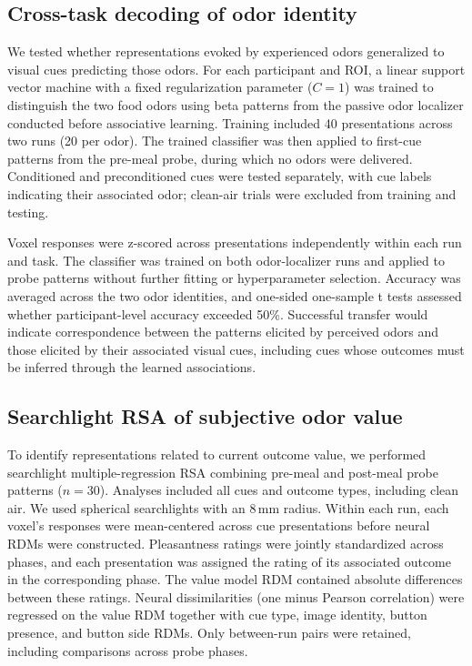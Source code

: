 \documentclass[9pt,twocolumn,twoside]{pnas-new}
\begin{document}
{\subsection*{Cross-task decoding of odor identity}

We tested whether representations evoked by experienced odors generalized to visual cues predicting those odors. For each participant and ROI, a linear support vector machine with a fixed regularization parameter ($C = 1$) was trained to distinguish the two food odors using beta patterns from the passive odor localizer conducted before associative learning. Training included 40 presentations across two runs (20 per odor). The trained classifier was then applied to first-cue patterns from the pre-meal probe, during which no odors were delivered. Conditioned and preconditioned cues were tested separately, with cue labels indicating their associated odor; clean-air trials were excluded from training and testing.

Voxel responses were z-scored across presentations independently within each run and task. The classifier was trained on both odor-localizer runs and applied to probe patterns without further fitting or hyperparameter selection. Accuracy was averaged across the two odor identities, and one-sided one-sample t tests assessed whether participant-level accuracy exceeded 50\%. Successful transfer would indicate correspondence between the patterns elicited by perceived odors and those elicited by their associated visual cues, including cues whose outcomes must be inferred through the learned associations.

\subsection*{Searchlight RSA of subjective odor value}

To identify representations related to current outcome value, we performed searchlight multiple-regression RSA combining pre-meal and post-meal probe patterns ($n = 30$). Analyses included all cues and outcome types, including clean air. We used spherical searchlights with an 8\,mm radius. Within each run, each voxel's responses were mean-centered across cue presentations before neural RDMs were constructed. Pleasantness ratings were jointly standardized across phases, and each presentation was assigned the rating of its associated outcome in the corresponding phase. The value model RDM contained absolute differences between these ratings. Neural dissimilarities (one minus Pearson correlation) were regressed on the value RDM together with cue type, image identity, button presence, and button side RDMs. Only between-run pairs were retained, including comparisons across probe phases.

}
\end{document}
